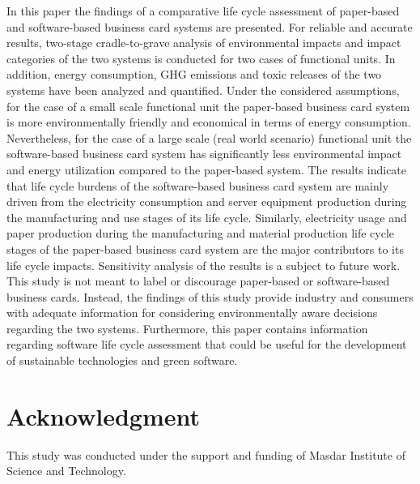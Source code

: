 \documentclass[conference]{IEEEtran}
\begin{document}
In this paper the findings of a comparative life cycle assessment of paper-based and software-based business card systems are presented. For reliable and accurate results, two-stage cradle-to-grave analysis of environmental impacts and impact categories of the two systems is conducted for two cases of functional units. In addition, energy consumption, GHG emissions and toxic releases of the two systems have been analyzed and quantified. Under the considered assumptions, for the case of a small scale functional unit the paper-based business card system is more environmentally friendly and economical in terms of energy consumption. Nevertheless, for the case of a large scale (real world scenario) functional unit the software-based business card system has significantly less environmental impact and energy utilization compared to the paper-based system. The results indicate that life cycle burdens of the software-based business card system are mainly driven from
the electricity consumption and server equipment production
during the manufacturing and use stages of its life cycle. Similarly, electricity usage and paper production during the manufacturing and material production life cycle stages of the paper-based business card system are the major contributors to its life cycle impacts. Sensitivity analysis of the results is a subject to future work. This study is not meant to label or discourage paper-based or software-based business cards. Instead, the findings of this study provide industry and consumers with adequate information for considering environmentally aware decisions
regarding the two systems. Furthermore, this paper contains information regarding software life cycle assessment that could be useful for the development of sustainable technologies and green software. 

\section*{Acknowledgment}

This study was conducted under the support and funding of Masdar Institute of Science and Technology.

\end{document}
